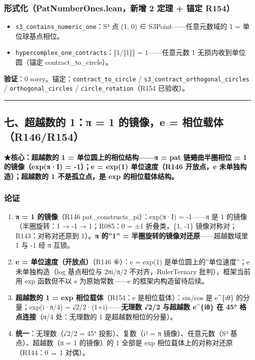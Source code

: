 \documentclass[
]{article}
\providecommand{\tightlist}{%
 \setlength{\itemsep}{0pt}\setlength{\parskip}{0pt}}
\begin{document}
\subsubsection{形式化（PatNumberOnes.lean，新增 2 定理 + 锚定
R154）}\label{ux5f62ux5f0fux5316patnumberones.leanux65b0ux589e-2-ux5b9aux7406-ux951aux5b9a-r154}

\begin{itemize}
\tightlist
\item
 \texttt{s3\_contains\_numeric\_one}：S³ 点 (1, 0) ∈
 S3Point------任意元数域的 1 = 单位球基点相位。
\item
 \texttt{hypercomplex\_one\_contracts}：‖1/‖1‖‖ = 1------任意元数 1
 无损内收到单位圆（锚定 contract\_to\_circle）。
\end{itemize}

\textbf{验证}：0 sorry。锚定：\texttt{contract\_to\_circle} /
\texttt{s3\_contract\_orthogonal\_circles} /
\texttt{orthogonal\_circles} / \texttt{circle\_rotation}（R154
已验收）。

\begin{center}\rule{0.5\linewidth}{0.5pt}\end{center}

\subsection{七、超越数的 1：π = 1 的镜像，e =
相位载体（R146/R154）}\label{ux4e03ux8d85ux8d8aux6570ux7684-1ux3c0-1-ux7684ux955cux50cfe-ux76f8ux4f4dux8f7dux4f53r146r154}

\textbf{★核心：超越数的 1 = 单位圆上的相位结构------π = pat
链蜷曲半圈相位 = 1 的镜像（exp(π·I) = -1）；e = exp(1) 单位速度（R146
开放点，e 未单独构造）；超越数的 1 不是孤立点，是 exp 的相位载体结构。}

\subsubsection{论证}\label{ux8bbaux8bc1-3}

\begin{enumerate}
\def\labelenumi{\arabic{enumi}.}
\tightlist
\item
 \textbf{π = 1 的镜像}（R146 pat\_constructs\_pi）：exp(π·I) =
 -1------π 是 1 的镜像（半圈旋转：1 → -1 → 1；R085：0 = ±1 折叠类，\{1,
 -1\} 镜像对称对；R143：对称对还原到 1）。\textbf{π 的''1'' =
 半圈旋转的镜像对还原}------超越数域里 1 与 -1 经 π 互锁。
\item
 \textbf{e = 单位速度（开放点）}（R146 ⑥）：e = exp(1)
 是单位圆上的''单位速度''；e 未单独构造（log 基点相位与 2πi/π/2
 不对齐，RulerTernary 批判），框架当前用 exp 函数但不以 e
 为原始常数------e 的框架内构造留待后续。
\item
 \textbf{超越数的 1 = exp 相位载体}（R154：e 是相位载体）：sin/cos 是
 e\^{}\{iθ\} 的分量；exp(i·π/4) = √2/2·(1+i)------\textbf{无理数 √2/2
 与超越数 e\^{}\{iθ\} 在 45° 格点连接}（π/4 处：无理数的 1
 是超越数相位的分量）。
\item
 \textbf{统一}：无理数（√2/2 = 45° 投影）、复数（i² = π
 镜像）、任意元数（S³ 基点）、超越数（π = 1 的镜像）的 1 全部是 exp
 相位载体上的对称对还原（R144：0 ↔ 1 对偶）。
\end{enumerate}
\end{document}
